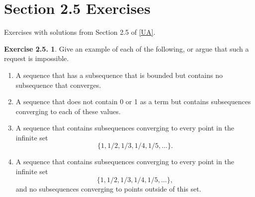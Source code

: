 \documentclass[12pt]{article}
\theoremstyle{definition}
\theoremstyle{exercise}
\newtheorem{exercise}{Exercise 2.5.}
\theoremstyle{solution}
\begin{document}
\section{Section 2.5 Exercises}

Exercises with solutions from Section 2.5 of \hyperlink{ua}{[UA]}.

\begin{exercise}
\label{ex:1}
    Give an example of each of the following, or argue that such a request is impossible.
    \begin{enumerate}
        \item A sequence that has a subsequence that is bounded but contains no subsequence that converges.

        \item A sequence that does not contain 0 or 1 as a term but contains subsequences converging to each of these values.

        \item A sequence that contains subsequences converging to every point in the infinite set
        \[
            \{ 1, 1/2, 1/3, 1/4, 1/5, \ldots \}.
        \]

        \item A sequence that contains subsequences converging to every point in the infinite set
        \[
            \{ 1, 1/2, 1/3, 1/4, 1/5, \ldots \},
        \]
        and no subsequences converging to points outside of this set.
    \end{enumerate}
\end{exercise}
\end{document}
